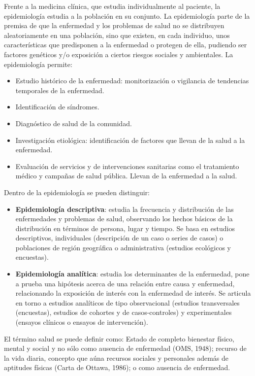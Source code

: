 Frente a la medicina clínica, que estudia individualmente al paciente, la epidemiología estudia a la población en su conjunto. La epidemiología parte de la premisa de que la enfermedad y los problemas de salud no se distribuyen aleatoriamente en una población, sino que existen, en cada individuo, unos características que predisponen a la enfermedad o protegen de ella, pudiendo ser factores genéticos y/o exposición a ciertos riesgos sociales y ambientales. La epidemiología permite:
\begin{itemize}[itemsep=0pt,parsep=0pt,topsep=0pt,partopsep=0pt]
	\item Estudio histórico de la enfermedad: monitorización o vigilancia de tendencias temporales de la enfermedad.
	\item Identificación de síndromes.
	\item Diagnóstico de salud de la comunidad.
	\item Investigación etiológica: identificación de factores que llevan de la salud a la enfermedad.
	\item Evaluación de servicios y de intervenciones sanitarias como el tratamiento médico y campañas de salud pública. Llevan de la enfermedad a la salud.
\end{itemize}

Dentro de la epidemiología se pueden distinguir:
\begin{itemize}[itemsep=0pt,parsep=0pt,topsep=0pt,partopsep=0pt]
	\item \textbf{Epidemiología descriptiva}: estudia la frecuencia y distribución de las enfermedades y problemas de salud, observando los hechos básicos de la distribución en términos de persona, lugar y tiempo. Se basa en estudios descriptivos, individuales (descripción de un caso o series de casos) o poblaciones de región geográfica o administrativa (estudios ecológicos y encuestas).
	\item \textbf{Epidemiología analítica}: estudia los determinantes de la enfermedad, pone a prueba una hipótesis acerca de una relación entre causa y enfermedad, relacionando la exposición de interés con la enfermedad de interés. Se articula en torno a estudios analíticos de tipo observacional (estudios transversales (encuestas), estudios de cohortes y de casos-controles) y experimentales (ensayos clínicos o ensayos de intervención).
\end{itemize}

El término salud se puede definir como: Estado de completo bienestar físico, mental y social y no sólo como ausencia de enfermedad (OMS, 1948); recurso de la vida diaria, concepto que aúna recursos sociales y personales además de aptitudes físicas (Carta de Ottawa, 1986); o como ausencia de enfermedad.
